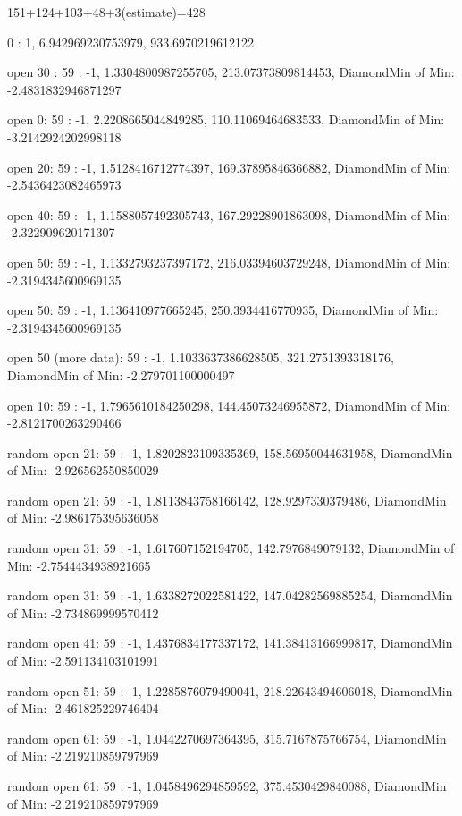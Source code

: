 \documentclass[]{article}
\theoremstyle{definition}
\begin{document}
151+124+103+48+3(estimate)=428




0 : 1, 6.942969230753979, 933.6970219612122

open 30 : 59 : -1, 1.3304800987255705, 213.07373809814453, DiamondMin of Min: -2.4831832946871297

open 0:   59 : -1, 2.2208665044849285, 110.11069464683533, DiamondMin of Min: -3.2142924202998118

open 20:  59 : -1, 1.5128416712774397, 169.37895846366882, DiamondMin of Min: -2.5436423082465973


open 40: 59 : -1, 1.1588057492305743, 167.29228901863098, DiamondMin of Min: -2.322909620171307

open 50: 59 : -1, 1.1332793237397172, 216.03394603729248, DiamondMin of Min: -2.3194345600969135

open 50: 59 : -1, 1.136410977665245, 250.3934416770935, DiamondMin of Min: -2.3194345600969135

open 50 (more data): 59 : -1, 1.1033637386628505, 321.2751393318176, DiamondMin of Min: -2.279701100000497

open 10: 59 : -1, 1.7965610184250298, 144.45073246955872, DiamondMin of Min: -2.8121700263290466


%

random open 21: 59 : -1, 1.8202823109335369, 158.56950044631958, DiamondMin of Min: -2.926562550850029

random open 21: 59 : -1, 1.8113843758166142, 128.9297330379486, DiamondMin of Min: -2.986175395636058

random open 31: 59 : -1, 1.617607152194705, 142.7976849079132, DiamondMin of Min: -2.7544434938921665

random open 31: 59 : -1, 1.6338272022581422, 147.04282569885254, DiamondMin of Min: -2.734869999570412

random open 41: 59 : -1, 1.4376834177337172, 141.38413166999817, DiamondMin of Min: -2.591134103101991

random open 51: 59 : -1, 1.2285876079490041, 218.22643494606018, DiamondMin of Min: -2.461825229746404

random open 61: 59 : -1, 1.0442270697364395, 315.7167875766754, DiamondMin of Min: -2.219210859797969

random open 61: 59 : -1, 1.0458496294859592, 375.4530429840088, DiamondMin of Min: -2.219210859797969
\end{document}
